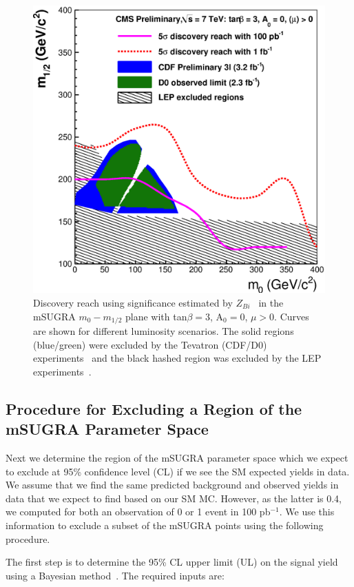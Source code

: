 \vspace{3 mm}
\begin{figure}[htb]
\begin{center}
\includegraphics[width=0.7\linewidth]{figs/massreachss_bi.eps}
\caption{Discovery reach using significance estimated by $Z_{Bi}$~\cite{cite:cousins} 
in the mSUGRA $m_{0}-m_{1/2}$ plane with tan$\beta = 3$, A$_0 = 0$, $\mu > 0$. 
Curves are shown for different luminosity scenarios. The solid regions (blue/green) were excluded by 
the Tevatron (CDF/D0) experiments~\cite{cdf:recentSusy, d0:recentSusy} and the black hashed region was excluded by the LEP 
experiments~\cite{lep:lepsusyreach}.\label{fig:ss_zbi}}
\end{center}
\end{figure}



\subsection{Procedure for Excluding a Region of the mSUGRA Parameter Space}
\label{sec:exclusion}

Next we  determine the region of  the mSUGRA parameter  space which we
expect  to exclude  at 95\%  confidence level  (CL) if  we see
the SM expected yields in data. 
We  assume  that  we find  the  same
predicted background and observed yields in data  that we expect
to  find based on  our SM  MC. However, as the latter is 0.4, we computed  
for both an observation of 0 or 1 event in 100 pb$^{-1}$. We  use this  
information to  exclude a subset of the mSUGRA points using the following procedure.

The first  step is to  determine the 95\%  CL upper limit (UL)  on the
signal yield using a Bayesian method~\cite{bayes}. The required  inputs 
are: 

